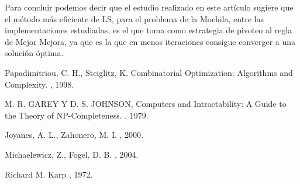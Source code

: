 \documentclass{ci5652}
\begin{document}
	Para concluir podemos decir que el estudio realizado en este artículo sugiere que el método más eficiente de LS, para el problema de la Mochila, entre las implementaciones estudiadas, es el que toma como estrategia de pivoteo al regla de Mejor Mejora, ya que es la que en menos iteraciones consigue converger a una solución óptima.


\small


\begin{thebibliography}{99}

Papadimitriou, C. H., Steiglitz, K. 
\newblock Combinatorial Optimization: Algorithms and Complexity. 
, 1998.


M. R. GAREY Y D. S. JOHNSON,
\newblock Computers and Intractability: A Guide to the Theory of NP-Completeness.
, 1979.

Joyanes, A. L., Zahonero, M. I. 
, 2000.

Michaelewicz, Z., Fogel, D. B. 
, 2004.

Richard M. Karp
, 1972.

\end{thebibliography}
\end{document}

